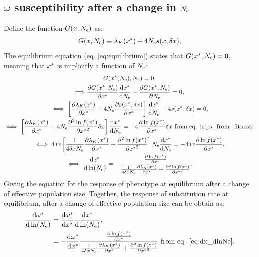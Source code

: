 \documentclass{article}
\renewcommand*{\bm}[1]{#1}%
\begin{document}
\subsection{$\bm{\omega}$ susceptibility after a change in $\bm{\Ne}$}
Define the function $G(x, N_{\mathrm{e}} )$ as:
\begin{gather}
G(x, N_{\mathrm{e}} ) \equiv \lambda_K (x^{*}) + 4 N_{\mathrm{e}} s(x, \delta x), 
\end{gather}
The equilibrium equation (eq. \ref{eq:equilibrium}) states that $G(x^{*}, N_{\mathrm{e}} )=0$, meaning that $x^{*}$ is implicitly a function of $N_{\mathrm{e}}$:
\begin{gather}
G(x^{*}(N_{\mathrm{e}}), N_{\mathrm{e}} ) = 0, \\
\Longrightarrow \frac{\partial G(x^{*}, N_{\mathrm{e}} ) }{\partial x^{*} }\frac{ \mathrm{d} x^{*}}{\mathrm{d} N_{\mathrm{e}}} + \frac{ \partial G(x^{*}, N_{\mathrm{e}} )}{\partial N_{\mathrm{e}}} = 0, \\
\iff \left[  \frac{\partial \lambda_K (x^{*}) }{\partial x^{*} }  + 4 N_{\mathrm{e}} \frac{ \partial s(x^{*}, \delta x) }{\partial x^{*} } \right]\frac{ \mathrm{d} x^{*}}{\mathrm{d} N_{\mathrm{e}}} + 4 s(x^{*}, \delta x) = 0, \\
\iff \left[  \frac{\partial \lambda_K (x^{*}) }{\partial x^{*} } + 4 N_{\mathrm{e}} \frac{ \partial^2 \ln f(x^{*}) }{\partial {x^{*}}^2}\delta x \right]\frac{ \mathrm{d} x^{*}}{\mathrm{d} N_{\mathrm{e}}}  = - 4 \frac{ \partial \ln f(x^{*}) }{\partial {x^{*}}}\delta x \text{ from eq. \ref{eq:s_from_fitness}}, \\
\iff 4 \delta x \left[ \frac{1}{4 \delta x N_{\mathrm{e}} } \frac{\partial \lambda_K (x^{*}) }{\partial x^{*} } + \frac{ \partial^2 \ln f(x^{*}) }{\partial {x^{*}}^2} \right] N_{\mathrm{e}} \frac{ \mathrm{d} x^{*}}{\mathrm{d} N_{\mathrm{e}}}  = - 4 \delta x \frac{ \partial \ln f(x^{*}) }{\partial {x^{*}}}, \\
\iff \frac{ \mathrm{d} x^{*}}{\mathrm{d} \ln (N_{\mathrm{e}})}  = - \frac{\frac{ \partial \ln f(x^{*}) }{\partial {x^{*}}}}{\frac{1}{4 \delta x N_{\mathrm{e}}} \frac{\partial \lambda_K (x^{*}) }{\partial x^{*} } + \frac{ \partial^2 \ln f(x^{*}) }{\partial {x^{*}}^2}}  \label{eq:dx_dlnNe}.
\end{gather}
Giving the equation for the response of phenotype at equilibrium after a change of effective population size.
Together, the response of substitution rate at equilibrium, after a change of effective population size can be obtain as:
\begin{align}
\frac{\mathrm{d} \omega^{*}}{\mathrm{d} \ln (N_{\mathrm{e}})} & = \frac{\mathrm{d} \omega^{*}}{\mathrm{d} x^{*}} \frac{ \mathrm{d} x^{*}}{\mathrm{d} \ln (N_{\mathrm{e}})}, \\
 &= - \frac{\mathrm{d} \omega^{*}}{\mathrm{d} x^{*}} \frac{\frac{ \partial \ln f(x^{*}) }{\partial {x^{*}}}}{\frac{1}{4 \delta x N_{\mathrm{e}} } \frac{\partial \lambda_K (x^{*}) }{\partial x^{*} } + \frac{ \partial^2 \ln f(x^{*}) }{\partial {x^{*}}^2}} \text{ from eq. \ref{eq:dx_dlnNe}} \label{eq:dw_dlnNe}.
\end{align}
\end{document}
